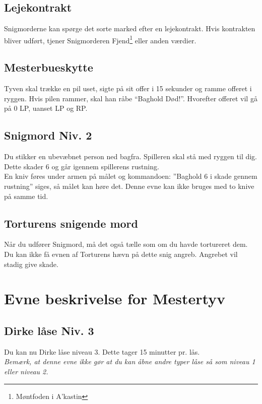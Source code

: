 


\subsection{Lejekontrakt}
Snigmorderne kan spørge det sorte marked efter en lejekontrakt. Hvis kontrakten
bliver udført, tjener Snigmorderen Fjend\footnote{Møntfoden i A'kastin} eller anden værdier.\\

\subsection{Mesterbueskytte}
Tyven skal trække en pil uset, sigte på sit offer i 15 sekunder og ramme offeret i ryggen. Hvis pilen rammer, skal han råbe “Baghold Død!”. Hvorefter offeret vil gå på 0 LP, uanset LP og RP.\\

\subsection{Snigmord Niv. 2}
Du stikker en ubevæbnet person ned bagfra. Spilleren skal stå med ryggen til dig. Dette skader 6 og går igennem spillerens rustning.\\ 
En kniv føres under armen på målet og kommandoen: ”Baghold 6 i skade gennem rustning” siges, så målet kan høre det. Denne evne kan ikke bruges med to knive på samme tid.\\

\subsection{Torturens snigende mord}
Når du udfører Snigmord, må det også tælle som om du havde tortureret dem. Du kan ikke få evnen af Torturens hævn på dette snig angreb. Angrebet vil stadig give skade.


\section{Evne beskrivelse for Mestertyv}

\subsection{Dirke låse Niv. 3}
Du kan nu Dirke låse niveau 3. Dette tager 15 minutter pr. lås.\\
\emph{Bemærk, at denne evne ikke gør at du kan åbne andre typer låse så som niveau 1 eller niveau 2.}\\

